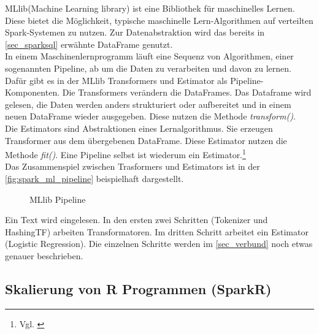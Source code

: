 MLlib(Machine Learning library) ist eine Bibliothek für maschinelles Lernen. Diese bietet die Möglichkeit, typische maschinelle Lern-Algorithmen auf verteilten Spark-Systemen zu nutzen. Zur Datenabstraktion wird das bereits in \ref{sec_sparksql} erwähnte DataFrame genutzt.  \\

\noindent
In einem Maschinenlernprogramm läuft eine Sequenz von Algorithmen, einer sogenannten Pipeline, ab um die Daten zu verarbeiten und davon zu lernen. 
Dafür gibt es in der MLlib Transformers und Estimator als Pipeline-Komponenten.
Die Transformers verändern die DataFrames. Das Dataframe wird gelesen, die Daten werden anders strukturiert oder aufbereitet und in einem neuen DataFrame wieder ausgegeben. Diese nutzen die Methode \textsl{transform()}.\\
Die Estimators sind Abstraktionen eines Lernalgorithmus. Sie erzeugen Transformer aus dem übergebenen DataFrame. Diese Estimator nutzen die Methode \textsl{fit()}.
Eine Pipeline selbst ist wiederum ein Estimator.\footnote{Vgl. \cite{AAWS15}} \\

\noindent
Das Zusammenspiel zwischen Trasformers und Estimators ist in der \autoref{fig:spark_ml_pipeline} beispielhaft dargestellt. \\
 
\begin{figure}[h]
  \centering
  \caption{MLlib Pipeline \cite{SPMLLIB}}\label{fig:spark_ml_pipeline}
\end{figure}

\noindent
Ein Text wird eingelesen. In den ersten zwei Schritten (Tokenizer und HashingTF) arbeiten Transformatoren. Im dritten Schritt arbeitet ein Estimator (Logistic Regression). Die einzelnen Schritte werden im \autoref{sec_verbund} noch etwas genauer beschrieben.





\newpage
\subsection{Skalierung von R Programmen (SparkR)}\label{sec_sparkr}

